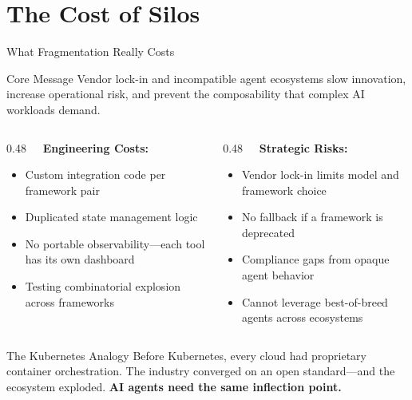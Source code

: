 \section{The Cost of Silos}

\begin{frame}{What Fragmentation Really Costs}
  \scriptsize
  \begin{alertblock}{Core Message}
    \scriptsize
    Vendor lock-in and incompatible agent ecosystems slow innovation,
    increase operational risk, and prevent the composability that complex
    AI workloads demand.
  \end{alertblock}

  \vspace{0.2cm}

  \begin{columns}[T]
    \begin{column}{0.48\textwidth}
      \textbf{\ \ Engineering Costs:}
      \begin{itemize}
        \item Custom integration code per framework pair
        \item Duplicated state management logic
        \item No portable observability---each tool has its own dashboard
        \item Testing combinatorial explosion across frameworks
      \end{itemize}
    \end{column}
    \begin{column}{0.48\textwidth}
      \textbf{\faLock\ \ Strategic Risks:}
      \begin{itemize}
        \item Vendor lock-in limits model and framework choice
        \item No fallback if a framework is deprecated
        \item Compliance gaps from opaque agent behavior
        \item Cannot leverage best-of-breed agents across ecosystems
      \end{itemize}
    \end{column}
  \end{columns}

  \vspace{-0.1cm}

  \begin{exampleblock}{The Kubernetes Analogy}
    \scriptsize
    Before Kubernetes, every cloud had proprietary container orchestration.
    The industry converged on an open standard---and the ecosystem exploded.
    \textbf{AI agents need the same inflection point.}
  \end{exampleblock}
\end{frame}
